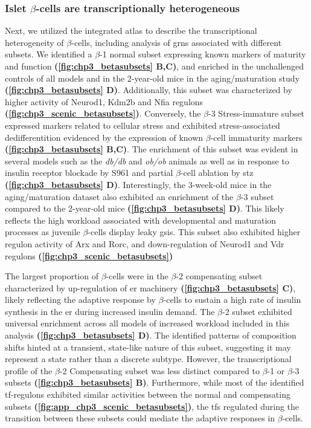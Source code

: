 \subsubsection{Islet $\beta$-cells are transcriptionally heterogeneous}
\par Next, we utilized the integrated atlas to describe the transcriptional heterogeneity of $\beta$-cells, including analysis of \glspl{grn} associated with different subsets. We identified a $\beta$-1 normal subset expressing known markers of maturity and function \textbf{(\autoref{fig:chp3_betasubsets} B,C)}, and enriched in the unchallenged controls of all models and in the 2-year-old mice in the aging/maturation study \textbf{(\autoref{fig:chp3_betasubsets} D)}. Additionally, this subset was characterized by higher activity of Neurod1, Kdm2b and Nfia regulons \textbf{(\autoref{fig:chp3_scenic_betasubsets})}. Conversely, the $\beta$-3 Stress-immature subset expressed markers related to cellular stress and exhibited stress-associated dedifferentition evidenced by the expression of known $\beta$-cell immaturity markers \textbf{(\autoref{fig:chp3_betasubsets} B,C)}. The enrichment of this subset was evident in several models such as the \textit{db/db} and \textit{ob/ob} animals as well as in response to insulin receptor blockade by S961 and partial $\beta$-cell ablation by \gls{stz} \textbf{(\autoref{fig:chp3_betasubsets} D)}. Interestingly, the 3-week-old mice in the aging/maturation dataset also exhibited an enrichment of the $\beta$-3 subset compared to the 2-year-old mice \textbf{(\autoref{fig:chp3_betasubsets} D)}. This likely reflects the high workload associated with developmental and maturation processes as juvenile $\beta$-cells display leaky \gls{gsis}. This subset also exhibited higher regulon activity of Arx and Rorc, and down-regulation of Neurod1 and Vdr regulons \textbf{(\autoref{fig:chp3_scenic_betasubsets})}\\%

\par The largest proportion of $\beta$-cells were in the $\beta$-2 compensating subset characterized by up-regulation of \gls{er} machinery \textbf{(\autoref{fig:chp3_betasubsets} C)}, likely reflecting the adaptive response by $\beta$-cells to sustain a high rate of insulin synthesis in the \gls{er} during increased insulin demand. The $\beta$-2 subset exhibited universal enrichment across all models of increased workload included in this analysis \textbf{(\autoref{fig:chp3_betasubsets} D)}. The identified patterns of composition shifts hinted at a transient, state-like nature of this subset, suggesting it may represent a state rather than a discrete subtype. However, the transcriptional profile of the $\beta$-2 Compensating subset was less distinct compared to $\beta$-1 or $\beta$-3 subsets \textbf{(\autoref{fig:chp3_betasubsets} B)}. Furthermore, while most of the identified \gls{tf}-regulons exhibited similar activities between the normal and compensating subsets \textbf{(\autoref{fig:app_chp3_scenic_betasubsets})}, the \glspl{tf} regulated during the transition between these subsets could mediate the adaptive responses in $\beta$-cells.\\

